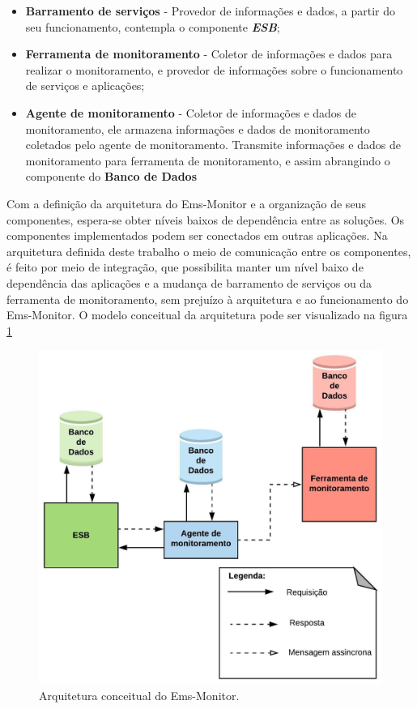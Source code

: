 \begin{itemize}
    \item \textbf{Barramento de serviços} - Provedor de informações e dados, a partir do seu funcionamento, contempla o componente \textbf{\textit{\acrshort{ESB}}}; 
    \item \textbf{Ferramenta de monitoramento} - Coletor de informações e dados para realizar o monitoramento, e provedor de informações sobre o funcionamento de serviços e aplicações; 
    \item \textbf{Agente de monitoramento} - Coletor de informações e dados de monitoramento, ele armazena informações e dados de monitoramento coletados pelo agente de monitoramento. Transmite informações e dados de monitoramento para ferramenta de monitoramento, e assim abrangindo o componente do \textbf{Banco de Dados}
\end{itemize}

Com a definição da arquitetura do Ems-Monitor e a organização de seus componentes, espera-se obter níveis baixos de dependência entre as soluções. Os componentes implementados podem ser conectados em outras aplicações. Na arquitetura definida deste trabalho o meio de comunicação entre os componentes, é feito por meio de integração, que possibilita manter um nível baixo de dependência das aplicações e a mudança de barramento de serviços ou da ferramenta de monitoramento, sem prejuízo à arquitetura e ao funcionamento do Ems-Monitor. O modelo conceitual da arquitetura pode ser visualizado na figura \ref{fun:fig:arquitetura_conceitual_monitoramento}

\begin{figure}[H]
	\begin{center}
	\includegraphics[scale = 0.90]{img/Arquitetura_Proposta_para_Monitoramento.jpeg}
		\caption{Arquitetura conceitual do Ems-Monitor.}
		\label{fun:fig:arquitetura_conceitual_monitoramento}
	\end{center}
\end{figure}

